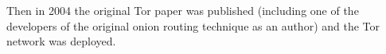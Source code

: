 %
%	
%	
%		
%		
%	
%	
%	
%	
%	
%	
%	
%	
%	
%	
%	
%	
%	
	
Then in 2004 the original Tor paper was published (including one of the developers of the original onion routing technique as an author) and the Tor network was deployed.